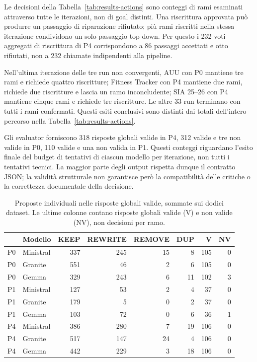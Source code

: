Le decisioni della Tabella~\ref{tab:results-actions} sono conteggi
di rami esaminati attraverso tutte le iterazioni, non di goal distinti.
Una riscrittura approvata pu\`o produrre un passaggio di riparazione
rifiutato; pi\`u rami riscritti nella stessa iterazione condividono
un solo passaggio top-down. Per questo i 232 voti aggregati di
riscrittura di P4 corrispondono a 86 passaggi accettati e otto
rifiutati, non a 232 chiamate indipendenti alla pipeline.

Nell'ultima iterazione delle tre run non convergenti, AUU con P0
mantiene tre rami e richiede quattro riscritture; Fitness Tracker
con P4 mantiene due rami, richiede due riscritture e lascia un ramo
inconcludente; SIA 25--26 con P4 mantiene cinque rami e richiede tre
riscritture. Le altre 33 run terminano con tutti i rami confermati.
Questi esiti conclusivi sono distinti dai totali dell'intero percorso
nella Tabella~\ref{tab:results-actions}.

Gli evaluator forniscono 318 risposte globali valide in P4, 312 valide
e tre non valide in P0, 110 valide e una non valida in P1. Questi
conteggi riguardano l'esito finale del budget di tentativi di ciascun
modello per iterazione, non tutti i tentativi tecnici. La maggior parte
degli output rispetta dunque il contratto JSON; la validit\`a
strutturale non garantisce per\`o la compatibilit\`a delle critiche
o la correttezza documentale della decisione.

\begin{table}[htbp]
\centering
\scriptsize
\caption{Proposte individuali nelle risposte globali valide, sommate sui dodici dataset. Le ultime colonne contano risposte globali valide (V) e non valide (NV), non decisioni per ramo.}
\label{tab:results-model-actions}
\begin{tabular}{llrrrrrr}
\toprule
 & \textbf{Modello} & \textbf{KEEP} & \textbf{REWRITE} & \textbf{REMOVE} & \textbf{DUP} & \textbf{V} & \textbf{NV} \\
\midrule
P0 & Ministral & 337 & 245 & 15 & 8 & 105 & 0 \\
P0 & Granite & 551 & 46 & 2 & 6 & 105 & 0 \\
P0 & Gemma & 329 & 243 & 6 & 11 & 102 & 3 \\
P1 & Ministral & 127 & 53 & 2 & 4 & 37 & 0 \\
P1 & Granite & 179 & 5 & 0 & 2 & 37 & 0 \\
P1 & Gemma & 103 & 72 & 0 & 6 & 36 & 1 \\
P4 & Ministral & 386 & 280 & 7 & 19 & 106 & 0 \\
P4 & Granite & 517 & 147 & 24 & 4 & 106 & 0 \\
P4 & Gemma & 442 & 229 & 3 & 18 & 106 & 0 \\
\bottomrule
\end{tabular}
\end{table}


